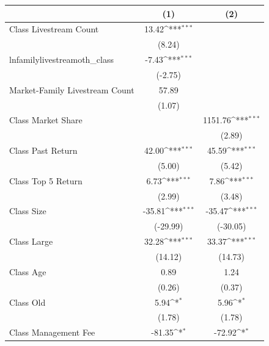 {
\def\sym#1{\ifmmode^{#1}\else\(^{#1}\)\fi}
\begin{tabular}{l*{2}{c}}
\toprule
                    &\multicolumn{1}{c}{(1)}         &\multicolumn{1}{c}{(2)}         \\
\midrule
Class Livestream Count&       13.42\sym{***}&                     \\
                    &      (8.24)         &                     \\
\addlinespace
lnfamilylivestreamoth\_class&       -7.43\sym{***}&                     \\
                    &     (-2.75)         &                     \\
\addlinespace
Market-Family Livestream Count&       57.89         &                     \\
                    &      (1.07)         &                     \\
\addlinespace
Class Market Share  &                     &     1151.76\sym{***}\\
                    &                     &      (2.89)         \\
\addlinespace
Class Past Return   &       42.00\sym{***}&       45.59\sym{***}\\
                    &      (5.00)         &      (5.42)         \\
\addlinespace
Class Top 5 Return  &        6.73\sym{***}&        7.86\sym{***}\\
                    &      (2.99)         &      (3.48)         \\
\addlinespace
Class Size          &      -35.81\sym{***}&      -35.47\sym{***}\\
                    &    (-29.99)         &    (-30.05)         \\
\addlinespace
Class Large         &       32.28\sym{***}&       33.37\sym{***}\\
                    &     (14.12)         &     (14.73)         \\
\addlinespace
Class Age           &        0.89         &        1.24         \\
                    &      (0.26)         &      (0.37)         \\
\addlinespace
Class Old           &        5.94\sym{*}  &        5.96\sym{*}  \\
                    &      (1.78)         &      (1.78)         \\
\addlinespace
Class Management Fee&      -81.35\sym{*}  &      -72.92\sym{*}  \\

\end{tabular}}
